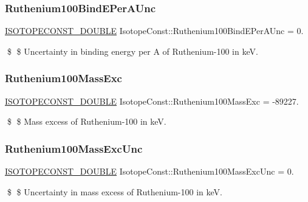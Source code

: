 \subsubsection{\texorpdfstring{Ruthenium100\+Bind\+E\+Per\+A\+Unc}{Ruthenium100BindEPerAUnc}}
{\footnotesize\ttfamily \mbox{\hyperlink{group___isotope_const-_macros_ga8f45a7272ce02c0b4c65c44636ed719a}{I\+S\+O\+T\+O\+P\+E\+C\+O\+N\+S\+T\+\_\+\+D\+O\+U\+B\+LE}} Isotope\+Const\+::\+Ruthenium100\+Bind\+E\+Per\+A\+Unc = 0.}

\$ \$ Uncertainty in binding energy per A of Ruthenium-\/100 in keV. \mbox{\label{group___isotope_const-_ruthenium-_ru100_ga0db91cba03999ad32d242dc4fa264141}} 
\subsubsection{\texorpdfstring{Ruthenium100\+Mass\+Exc}{Ruthenium100MassExc}}
{\footnotesize\ttfamily \mbox{\hyperlink{group___isotope_const-_macros_ga8f45a7272ce02c0b4c65c44636ed719a}{I\+S\+O\+T\+O\+P\+E\+C\+O\+N\+S\+T\+\_\+\+D\+O\+U\+B\+LE}} Isotope\+Const\+::\+Ruthenium100\+Mass\+Exc = -\/89227.}

\$ \$ Mass excess of Ruthenium-\/100 in keV. \mbox{\label{group___isotope_const-_ruthenium-_ru100_ga7e33f464b901ce0c458be10d165b0dac}} 
\subsubsection{\texorpdfstring{Ruthenium100\+Mass\+Exc\+Unc}{Ruthenium100MassExcUnc}}
{\footnotesize\ttfamily \mbox{\hyperlink{group___isotope_const-_macros_ga8f45a7272ce02c0b4c65c44636ed719a}{I\+S\+O\+T\+O\+P\+E\+C\+O\+N\+S\+T\+\_\+\+D\+O\+U\+B\+LE}} Isotope\+Const\+::\+Ruthenium100\+Mass\+Exc\+Unc = 0.}

\$ \$ Uncertainty in mass excess of Ruthenium-\/100 in keV. \mbox{\label{group___isotope_const-_ruthenium-_ru100_gad77ca6391de8ee8e981a2681191851d0}} 
